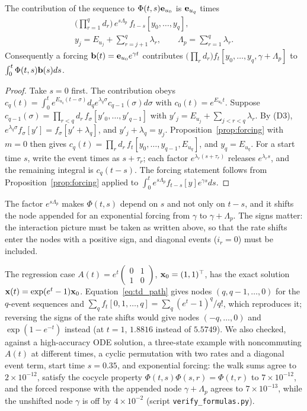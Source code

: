 \begin{proposition}
The contribution of the sequence to $\Phi(t,s){\bf e}_{u_0}$ is ${\bf e}_{u_q}$ times
\begin{equation}\label{eq:td_path}
\begin{gathered}
\Big(\prod_{r=1}^qd_r\Big)\,e^{s\Lambda_p}\,f_{t-s}[y_0,\dots,y_q],\\
y_j=E_{u_j}+\sum_{r=j+1}^q\lambda_r,\qquad \Lambda_p=\sum_{r=1}^q\lambda_r .
\end{gathered}
\end{equation}
Consequently a forcing ${\bf b}(t)={\bf e}_{u_0}e^{\gamma t}$ contributes $\big(\prod_rd_r\big)f_t[y_0,\dots,y_q,\gamma+\Lambda_p]$ to $\int_0^t\Phi(t,s){\bf b}(s)ds$.
\end{proposition}
\begin{proof}
Take $s=0$ first. The contribution obeys $c_q(t)=\int_0^te^{E_{u_q}(t-\sigma)}d_qe^{\lambda_q\sigma}c_{q-1}(\sigma)d\sigma$ with $c_0(t)=e^{E_{u_0}t}$. Suppose $c_{q-1}(\sigma)=\prod_{r<q}d_r\,f_\sigma[y'_0,\dots,y'_{q-1}]$ with $y'_j=E_{u_j}+\sum_{j<r<q}\lambda_r$. By (D3), $e^{\lambda_q\sigma}f_\sigma[y']=f_\sigma[y'+\lambda_q]$, and $y'_j+\lambda_q=y_j$. Proposition~\ref{prop:forcing} with $m=0$ then gives $c_q(t)=\prod_rd_r\,f_t[y_0,\dots,y_{q-1},E_{u_q}]$, and $y_q=E_{u_q}$. For a start time $s$, write the event times as $s+\tau_r$; each factor $e^{\lambda_r(s+\tau_r)}$ releases $e^{\lambda_rs}$, and the remaining integral is $c_q(t-s)$. The forcing statement follows from Proposition~\ref{prop:forcing} applied to $\int_0^te^{s\Lambda_p}f_{t-s}[y]e^{\gamma s}ds$.
\end{proof}
The factor $e^{s\Lambda_p}$ makes $\Phi(t,s)$ depend on $s$ and not only on $t-s$, and it shifts the node appended for an exponential forcing from $\gamma$ to $\gamma+\Lambda_p$. The signs matter: the interaction picture must be taken as written above, so that the rate shifts enter the nodes with a positive sign, and diagonal events ($i_r=0$) must be included.

The regression case $A(t)=e^t\left(\begin{smallmatrix}0&1\\1&0\end{smallmatrix}\right)$, ${\bf x}_0=(1,1)^\top$, has the exact solution ${\bf x}(t)=\exp(e^t-1){\bf x}_0$. Equation~\eqref{eq:td_path} gives nodes $(q,q-1,\dots,0)$ for the $q$-event sequences and $\sum_qf_t[0,1,\dots,q]=\sum_q(e^t-1)^q/q!$, which reproduces it; reversing the signs of the rate shifts would give nodes $(-q,\dots,0)$ and $\exp(1-e^{-t})$ instead (at $t=1$, $1.8816$ instead of $5.5749$). We also checked, against a high-accuracy ODE solution, a three-state example with noncommuting $A(t)$ at different times, a cyclic permutation with two rates and a diagonal event term, start time $s=0.35$, and exponential forcing: the walk sums agree to $2\times10^{-12}$, satisfy the cocycle property $\Phi(t,s)\Phi(s,r)=\Phi(t,r)$ to $7\times10^{-12}$, and the forced response with the appended node $\gamma+\Lambda_p$ agrees to $7\times10^{-13}$, while the unshifted node $\gamma$ is off by $4\times10^{-2}$ (script \texttt{verify\_formulas.py}).
